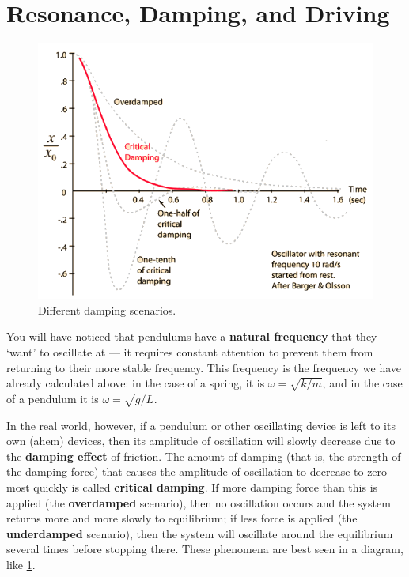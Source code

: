 \documentclass[a4paper]{amsbook}
\theoremstyle{definition}
\numberwithin{exercise}{chapter}
\numberwithin{exercise}{chapter}
\begin{document}
\section{Resonance, Damping, and Driving}
\begin{figure}
  \centering
  \includegraphics[width=\textwidth]{damping}
  \caption{Different damping scenarios.\label{fig:damping}}
\end{figure}
You will have noticed that pendulums have a \textbf{natural frequency} that they `want' to oscillate at --- it requires
constant attention to prevent them from returning to their more stable frequency. This frequency is the frequency we have
already calculated above: in the case of a spring, it is $ \omega = \sqrt{k/m} $, and in the case of a pendulum it is $ \omega = \sqrt{g/L} $.

In the real world, however, if a pendulum or other oscillating device is left to its own (ahem) devices, then its amplitude of oscillation
will slowly decrease due to the \textbf{damping effect} of friction. The amount of damping (that is, the strength of the damping force) that
causes the amplitude of oscillation to decrease to zero most quickly is called \textbf{critical damping}. If more damping force than this is
applied (the \textbf{overdamped} scenario), then no oscillation occurs and the system returns more and more slowly to equilibrium; if less
force is applied (the \textbf{underdamped} scenario), then the system will oscillate around the equilibrium several times before stopping there.
These phenomena are best seen in a diagram, like \cref{fig:damping}.
\end{document}
